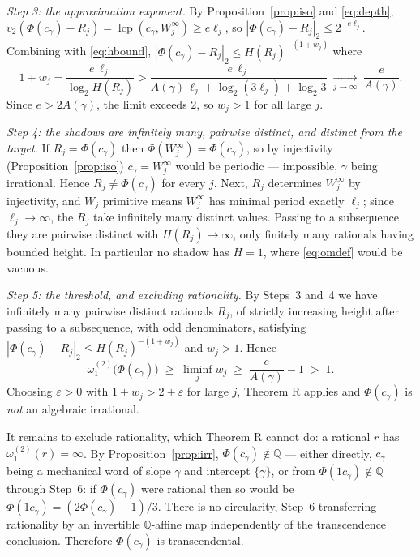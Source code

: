 \documentclass[11pt,reqno]{amsart}
\theoremstyle{plain}
\theoremstyle{definition}
\DeclareMathOperator{\lcp}{lcp}
\newcommand{\Q}{\mathbb{Q}}
\newcommand{\PH}{\Phi}
\newcommand{\Av}{A(\gamma)}
\newcommand{\om}{\omega_1^{(2)}}
\newcommand{\vtwo}{v_2}
\begin{document}
\emph{Step 3: the approximation exponent.} By Proposition~\ref{prop:iso} and \eqref{eq:depth},
$\vtwo(\PH(c_\gamma)-R_j)=\lcp(c_\gamma,W_j^{\infty})\ge e\ell_j$, so
$|\PH(c_\gamma)-R_j|_2\le2^{-e\ell_j}$. Combining with \eqref{eq:hbound},
$|\PH(c_\gamma)-R_j|_2\le H(R_j)^{-(1+w_j)}$ where
\begin{equation}\label{eq:wj}
  1+w_j=\frac{e\,\ell_j}{\log_2 H(R_j)}
  >\frac{e\,\ell_j}{\Av\,\ell_j+\log_2(3\ell_j)+\log_2 3}
  \;\xrightarrow[j\to\infty]{}\;\frac{e}{\Av}.
\end{equation}
Since $e>2\Av$, the limit exceeds $2$, so $w_j>1$ for all large $j$.

\emph{Step 4: the shadows are infinitely many, pairwise distinct, and distinct from the target.} If
$R_j=\PH(c_\gamma)$ then $\PH(W_j^{\infty})=\PH(c_\gamma)$, so by injectivity
(Proposition~\ref{prop:iso}) $c_\gamma=W_j^{\infty}$ would be periodic --- impossible, $\gamma$
being irrational. Hence $R_j\ne\PH(c_\gamma)$ for every $j$. Next, $R_j$ determines $W_j^{\infty}$
by injectivity, and $W_j$ primitive means $W_j^{\infty}$ has minimal period exactly $\ell_j$; since
$\ell_j\to\infty$, the $R_j$ take infinitely many distinct values. Passing to a subsequence they are
pairwise distinct with $H(R_j)\to\infty$, only finitely many rationals having bounded height. In
particular no shadow has $H=1$, where \eqref{eq:omdef} would be vacuous.

\emph{Step 5: the threshold, and excluding rationality.} By Steps~3 and~4 we have infinitely many
pairwise distinct rationals $R_j$, of strictly increasing height after passing to a subsequence,
with odd denominators, satisfying $|\PH(c_\gamma)-R_j|_2\le H(R_j)^{-(1+w_j)}$ and $w_j>1$. Hence
\begin{equation}\label{eq:omlb}
  \om\bigl(\PH(c_\gamma)\bigr)\;\ge\;\liminf_j w_j\;\ge\;\frac{e}{\Av}-1\;>\;1 .
\end{equation}
Choosing $\varepsilon>0$ with $1+w_j>2+\varepsilon$ for large $j$, Theorem R applies and
$\PH(c_\gamma)$ is \emph{not} an algebraic irrational.

It remains to exclude rationality, which Theorem R cannot do: a rational $r$ has $\om(r)=\infty$.
By Proposition~\ref{prop:irr}, $\PH(c_\gamma)\notin\Q$ --- either directly, $c_\gamma$ being a
mechanical word of slope $\gamma$ and intercept $\{\gamma\}$, or from $\PH(1c_\gamma)\notin\Q$
through Step~6: if $\PH(c_\gamma)$ were rational then so would be
$\PH(1c_\gamma)=(2\PH(c_\gamma)-1)/3$. There is no circularity, Step~6 transferring rationality by
an invertible $\Q$-affine map independently of the transcendence conclusion. Therefore
$\PH(c_\gamma)$ is transcendental.
\end{document}
